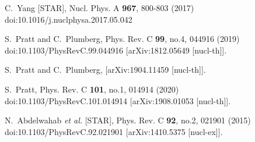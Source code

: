 \begin{thebibliography}{99}
C.~Yang [STAR],
Nucl. Phys. A \textbf{967}, 800-803 (2017)
doi:10.1016/j.nuclphysa.2017.05.042

S.~Pratt and C.~Plumberg,
Phys. Rev. C \textbf{99}, no.4, 044916 (2019)
doi:10.1103/PhysRevC.99.044916
[arXiv:1812.05649 [nucl-th]].

S.~Pratt and C.~Plumberg,
[arXiv:1904.11459 [nucl-th]].


S.~Pratt,
Phys. Rev. C \textbf{101}, no.1, 014914 (2020)
doi:10.1103/PhysRevC.101.014914
[arXiv:1908.01053 [nucl-th]].


N.~Abdelwahab \textit{et al.} [STAR],
Phys. Rev. C \textbf{92}, no.2, 021901 (2015)
doi:10.1103/PhysRevC.92.021901
[arXiv:1410.5375 [nucl-ex]].



         
\end{thebibliography}
